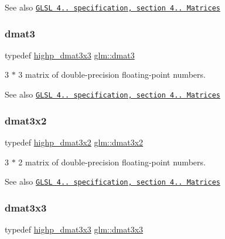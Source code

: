 \begin{DoxySeeAlso}{See also}
\href{http://www.opengl.org/registry/doc/GLSLangSpec.4.20.8.pdf}{\tt G\+L\+SL 4.. specification, section 4.. Matrices} 
\end{DoxySeeAlso}
\mbox{\label{group__core__types_ga25fd62195c3ef5ac0d32ead1dbfbb929}} 
\subsubsection{\texorpdfstring{dmat3}{dmat3}}
{\footnotesize\ttfamily typedef \hyperlink{group__core__precision_ga604f966e7bf042f298beb3b262287970}{highp\+\_\+dmat3x3} \hyperlink{group__core__types_ga25fd62195c3ef5ac0d32ead1dbfbb929}{glm\+::dmat3}}

3 $\ast$ 3 matrix of double-\/precision floating-\/point numbers.

\begin{DoxySeeAlso}{See also}
\href{http://www.opengl.org/registry/doc/GLSLangSpec.4.20.8.pdf}{\tt G\+L\+SL 4.. specification, section 4.. Matrices} 
\end{DoxySeeAlso}
\mbox{\label{group__core__types_ga2db259d2e7921065c5b7d4dca9547960}} 
\subsubsection{\texorpdfstring{dmat3x2}{dmat3x2}}
{\footnotesize\ttfamily typedef \hyperlink{group__core__precision_gafe7ef85b0bc26e754cbf83fed54bf106}{highp\+\_\+dmat3x2} \hyperlink{group__core__types_ga2db259d2e7921065c5b7d4dca9547960}{glm\+::dmat3x2}}

3 $\ast$ 2 matrix of double-\/precision floating-\/point numbers.

\begin{DoxySeeAlso}{See also}
\href{http://www.opengl.org/registry/doc/GLSLangSpec.4.20.8.pdf}{\tt G\+L\+SL 4.. specification, section 4.. Matrices} 
\end{DoxySeeAlso}
\mbox{\label{group__core__types_gaf3c29c4f75a448f308463e75ca2efd4c}} 
\subsubsection{\texorpdfstring{dmat3x3}{dmat3x3}}
{\footnotesize\ttfamily typedef \hyperlink{group__core__precision_ga604f966e7bf042f298beb3b262287970}{highp\+\_\+dmat3x3} \hyperlink{group__core__types_gaf3c29c4f75a448f308463e75ca2efd4c}{glm\+::dmat3x3}}


